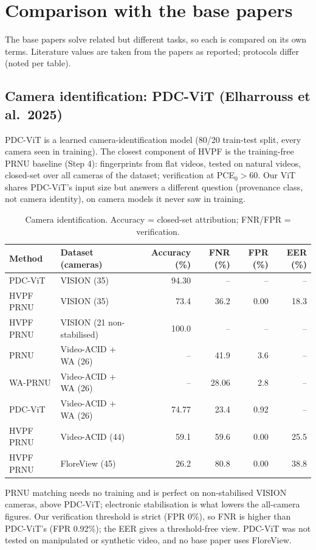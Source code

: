 \documentclass[11pt,a4paper]{article}
\begin{document}
\section{Comparison with the base papers}
The base papers solve related but different tasks, so each is compared on its own terms. Literature values are taken from the papers as reported; protocols differ (noted per table).
\subsection{Camera identification: PDC-ViT (Elharrouss et al.~2025)}
PDC-ViT is a learned camera-identification model (80/20 train-test split, every camera seen in training). The closest component of HVPF is the training-free PRNU baseline (Step 4): fingerprints from flat videos, tested on natural videos, closed-set over all cameras of the dataset; verification at PCE$_0>60$. Our ViT shares PDC-ViT's input size but answers a different question (provenance class, not camera identity), on camera models it never saw in training.
\begin{table}[H]\centering\small\caption{Camera identification. Accuracy = closed-set attribution; FNR/FPR = verification.}\setlength{\tabcolsep}{4pt}\begin{tabular}{llrrrr}\toprule Method & Dataset (cameras) & Accuracy (\%) & FNR (\%) & FPR (\%) & EER (\%) \\\midrule
PDC-ViT \cite{pdcvit} & VISION (35) & 94.30 & -- & -- & -- \\
HVPF PRNU & VISION (35) & 73.4 & 36.2 & 0.00 & 18.3 \\
HVPF PRNU & VISION (21 non-stabilised) & 100.0 & -- & -- & -- \\
\midrule PRNU \cite{pdcvit} & Video-ACID + WA (26) & -- & 41.9 & 3.6 & -- \\
WA-PRNU \cite{pdcvit} & Video-ACID + WA (26) & -- & 28.06 & 2.8 & -- \\
PDC-ViT \cite{pdcvit} & Video-ACID + WA (26) & 74.77 & 23.4 & 0.92 & -- \\
HVPF PRNU & Video-ACID (44) & 59.1 & 59.6 & 0.00 & 25.5 \\
\midrule HVPF PRNU & FloreView (45) & 26.2 & 80.8 & 0.00 & 38.8 \\
\bottomrule\end{tabular}\end{table}
PRNU matching needs no training and is perfect on non-stabilised VISION cameras, above PDC-ViT; electronic stabilisation is what lowers the all-camera figures. Our verification threshold is strict (FPR 0\%), so FNR is higher than PDC-ViT's (FPR 0.92\%); the EER gives a threshold-free view. PDC-ViT was not tested on manipulated or synthetic video, and no base paper uses FloreView.
\end{document}
